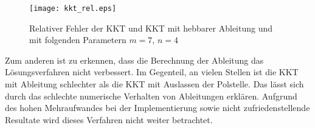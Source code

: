\begin{figure}[h]
\centering
	\texttt{[image: kkt\_rel.eps]}
	\caption{Relativer Fehler der KKT und KKT mit hebbarer Ableitung und mit folgenden Parametern $m=7$,  $n=4$}
	\label{fig:kkt_rel}
\end{figure}
Zum anderen ist zu erkennen, dass die Berechnung der Ableitung das Lösungsverfahren nicht verbessert. Im Gegenteil, an vielen Stellen ist die KKT mit Ableitung schlechter als die KKT mit Auslassen der Polstelle. Das lässt sich durch das schlechte numerische Verhalten von Ableitungen erklären. Aufgrund des hohen Mehraufwandes bei der Implementierung sowie nicht zufriedenstellende Resultate wird dieses Verfahren nicht weiter betrachtet. 
\newpage
